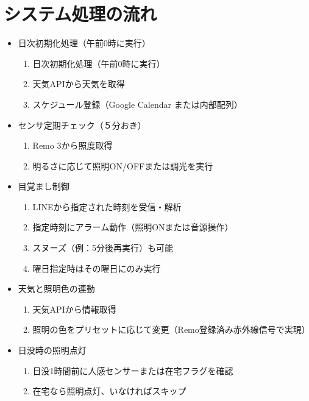 \documentclass{jarticle}
\begin{document}
\section*{システム処理の流れ}
\begin{itemize}
    \item 日次初期化処理（午前0時に実行）\\
        \begin{enumerate}
            \item 日次初期化処理（午前0時に実行）\\
            \item 天気APIから天気を取得 \\
            \item スケジュール登録（Google Calendar または内部配列）\\
        \end{enumerate}
    \item センサ定期チェック（５分おき）\\
        \begin{enumerate}
            \item Remo 3から照度取得\\
            \item 明るさに応じて照明ON/OFFまたは調光を実行\\
        \end{enumerate}
    \item 目覚まし制御 \\
        \begin{enumerate}
            \item LINEから指定された時刻を受信・解析\\
            \item 指定時刻にアラーム動作（照明ONまたは音源操作）\\
            \item スヌーズ（例：5分後再実行）も可能 \\
            \item 曜日指定時はその曜日にのみ実行 \\
        \end{enumerate}
    \item  天気と照明色の連動\\
        \begin{enumerate}
            \item 天気APIから情報取得\\
            \item 照明の色をプリセットに応じて変更（Remo登録済み赤外線信号で実現）\\
        \end{enumerate}
    \item 日没時の照明点灯\\
        \begin{enumerate}
            \item 日没1時間前に人感センサーまたは在宅フラグを確認\\
            \item 在宅なら照明点灯、いなければスキップ\\
        \end{enumerate}
\end{itemize}
\end{document}
